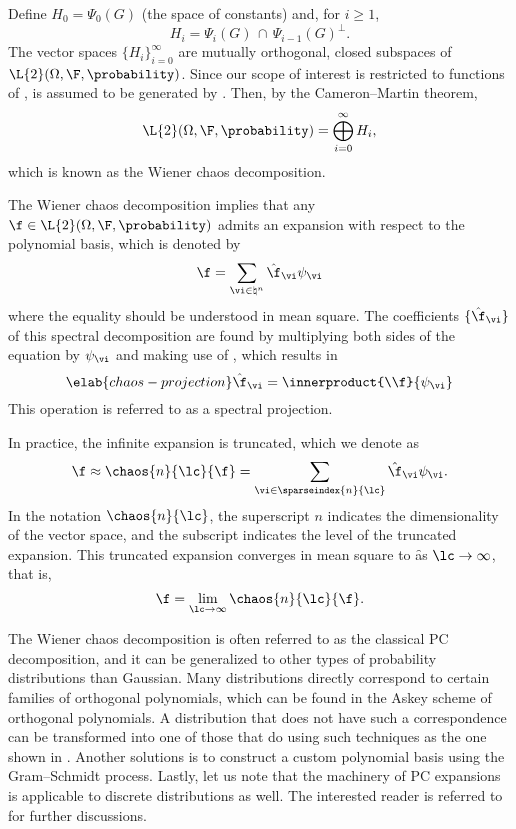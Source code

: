 Define $H_0 = \Psi_0(G)$ (the space of constants) and, for $i \geq 1$,
\[
  H_i = \Psi_i(G) \, \cap \, \Psi_{i - 1}(G)^\perp.
\]
The vector spaces $\{ H_i \}_{i = 0}^\infty$ are mutually orthogonal, closed
subspaces of $\L{2}(\Omega, \F, \probability)$. Since our scope of interest is
restricted to functions of \vx, \F is assumed to be generated by \vx. Then, by
the Cameron--Martin theorem,
\[
  \L{2}(\Omega, \F, \probability) = \bigoplus_{i = 0}^\infty H_i,
\]
which is known as the Wiener chaos decomposition.

The Wiener chaos decomposition implies that any $\f \in \L{2}(\Omega, \F,
\probability)$ admits an expansion with respect to the polynomial basis, which
is denoted by
\[
  \f = \sum_{\vi \in \natural^n} \hat{\f}_{\vi} \psi_{\vi}
\]
where the equality should be understood in mean square. The coefficients $\{
\hat{\f}_{\vi} \}$ of this spectral decomposition are found by multiplying both
sides of the equation by $\psi_{\vi}$ and making use of
, which results in
\begin{equation} \elab{chaos-projection}
  \hat{\f}_{\vi} = \innerproduct{\\f}{\psi_{\vi}}
\end{equation}
This operation is referred to as a spectral projection.

In practice, the infinite expansion is truncated, which we denote as
\[
  \f \approx \chaos{n}{\lc}{\f} = \sum_{\vi \in \sparseindex{n}{\lc}} \hat{\f}_{\vi} \psi_{\vi}.
\]
In the notation $\chaos{n}{\lc}$, the superscript $n$ indicates the
dimensionality of the vector space, and the subscript \lc indicates the level of
the truncated expansion. This truncated expansion converges in mean square to \f
as $\lc \to \infty$, that is,
\[
  \f = \lim_{\lc \to \infty} \chaos{n}{\lc}{\f}.
\]

The Wiener chaos decomposition is often referred to as the classical \acf{PC}
decomposition, and it can be generalized to other types of probability
distributions than Gaussian. Many distributions directly correspond to certain
families of orthogonal polynomials, which can be found in the Askey scheme of
orthogonal polynomials. A distribution that does not have such a correspondence
can be transformed into one of those that do using such techniques as the one
shown in . Another solutions is to construct a
custom polynomial basis using the Gram--Schmidt process. Lastly, let us note
that the machinery of \ac{PC} expansions is applicable to discrete distributions
as well. The interested reader is referred to \cite{xiu2010} for further
discussions.
